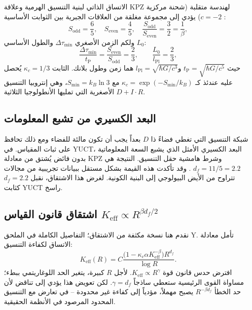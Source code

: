 \documentclass[12pt,a4paper]{article}
\newcommand{\kappac}{\kappa_c}
\newcommand{\Keff}{K_{\mathrm{eff}}}
\newcommand{\betaf}{\beta}
\newcommand{\Lpl}{l_{\mathrm{Pl}}}
\newcommand{\tP}{t_{\mathrm{P}}}
\newcommand{\Sodd}{S_{\mathrm{odd}}}
\newcommand{\Seven}{S_{\mathrm{even}}}
\newcommand{\Dtau}{\Delta\tau_{\min}}
\newcommand{\Lzero}{L_0}
\begin{document}
	الاتساق الذاتي لبنية التنسيق الهرمية وعلاقة KPZ لهندسة متقلبة (شحنة مركزية \(c=-2\)) يؤدي إلى مجموعة مغلقة من العلاقات الجبرية بين الثوابت الأساسية \cite{AppendixY}:
	\begin{equation}
		\Sodd = \frac{6}{5},\quad \Seven = \frac{4}{5},\quad \frac{\Sodd}{\Seven} = \frac{3}{2} = \frac{1}{\betaf},
	\end{equation}
	ولكم الزمن الأصغري \(\Dtau\) والطول الأساسي \(\Lzero\):
	\begin{equation}
		\frac{\Dtau}{\tP} = \frac{\Seven}{\Sodd} = \frac{2}{3}, \qquad \frac{\Lzero}{\Lpl} = \frac{2}{3},
		\label{eq:algebraic-loop}
	\end{equation}
	حيث \(\tP = \sqrt{\hbar G / c^5}\) و\(\Lpl = \sqrt{\hbar G / c^3}\) هما زمن وطول بلانك. الثابت \(\kappac = 1/3\) يُحصل عليه عندئذ كـ \(\kappac = \exp(-S_{\min}/k_B)\) مع \(S_{\min} = k_B \ln 3\)، وهي إنتروبيا التنسيق الأصغرية التي تمليها الأنطولوجيا الثلاثية \(D + I \cdot R\).
	
	\subsection{البعد الكسيري من تشبع المعلومات}
	
	شبكة التنسيق التي تغطي فضاءً ذا \(D\) بعداً يجب أن تكون مالئة للفضاء ومع ذلك تحافظ على ثبات المقياس. في YUCT، البعد الكسيري الأمثل الذي يشبع السعة المعلوماتية بدون فائض يُشتق من معادلة KPZ وشرط هامشية حقل التنسيق. النتيجة هي \(d_f = 11/5 = 2.2\) \cite{AppendixL}. وقد تأكدت هذه القيمة بشكل مستقل ببيانات تجريبية من مجالات تتراوح من الأيض البيولوجي إلى البنية الكونية. لغرض هذا الاشتقاق، نقبل \(d_f = 2.2\) كثابت YUCT راسخ.
	
	\subsection{اشتقاق قانون القياس \(K_{\mathrm{eff}} \propto R^{\beta d_f/2}\)}
	
	نقدم هنا نسخة مكثفة من الاشتقاق؛ التفاصيل الكاملة في الملحق Y. تأمل معادلة الاتساق لكفاءة التنسيق:
	\begin{equation}
		\Keff(R) = C \frac{\bigl(1 - \kappac \alpha \Keff^{-\betaf}\bigr) R^{d_f}}{\log R}.
		\label{eq:consistency}
	\end{equation}
	افترض حدس قانون قوة \(\Keff \propto R^{\gamma}\). لأجل \(R\) كبيرة، يتغير الحد اللوغاريتمي ببطء؛ مساواة القوى الرئيسية ستعطي ساذجاً \(\gamma = d_f\). لكن تعويض هذا يؤدي إلى تناقض لأن حد الخطأ \(R^{-\beta d_f}\) يصبح مهملاً، مؤدياً إلى كفاءة غير محدودة – في تعارض مع التنسيق المحدود المرصود في الأنظمة الحقيقية.
	
\end{document}
